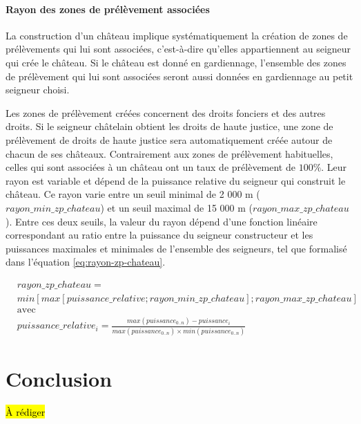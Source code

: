 \paragraph{Rayon des zones de prélèvement associées}

La construction d'un château implique systématiquement la création de zones de prélèvements qui lui sont associées, c'est-à-dire qu'elles appartiennent au seigneur qui crée le château.
Si le château est donné en gardiennage, l'ensemble des zones de prélèvement qui lui sont associées seront aussi données en gardiennage au petit seigneur choisi.

Les zones de prélèvement créées concernent des droits fonciers et des autres droits.
Si le seigneur châtelain obtient les droits de haute justice, une zone de prélèvement de droits de haute justice sera automatiquement créée autour de chacun de ses châteaux.
Contrairement aux zones de prélèvement habituelles, celles qui sont associées à un château ont un taux de prélèvement de $100\%$.
Leur rayon est variable et dépend de la puissance relative du seigneur qui construit le château.
Ce rayon varie entre un seuil minimal de 2 000 m ($rayon\_min\_zp\_chateau$) et un seuil maximal de 15 000 m ($rayon\_max\_zp\_chateau$).
Entre ces deux seuils, la valeur du rayon dépend d'une fonction linéaire correspondant au ratio entre la puissance du seigneur constructeur et les puissances maximales et minimales de l'ensemble des seigneurs, tel que formalisé dans l'équation \ref{eq:rayon-zp-chateau}. 

\begin{equation}\label{eq:rayon-zp-chateau}
\begin{aligned}
& rayon\_zp\_chateau = \\
& min  \left[ max \left[ puissance\_relative; rayon\_min\_zp\_chateau \right]  ; rayon\_max\_zp\_chateau \right]
\\
& \text{avec}
\\
& puissance\_relative_i = \frac{max(puissance_{0..n}) - puissance_i}{max(puissance_{0..n}) \times min(puissance_{0..n})}
\end{aligned}
\end{equation}

\section*{Conclusion}

\hl{À rédiger}

